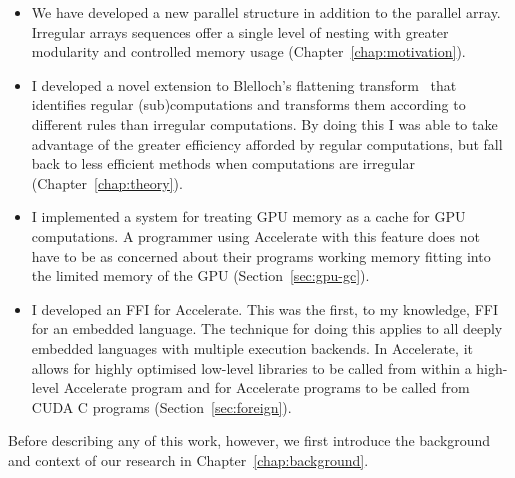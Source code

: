 \begin{itemize}
\item We have developed a new parallel structure in addition to the parallel array. Irregular arrays sequences offer a single level of nesting with greater modularity and controlled memory usage (Chapter~\ref{chap:motivation}).
\item I developed a novel extension to Blelloch's flattening transform~\cite{Blelloch:compiling1988,Blelloch:nesl1995} that identifies regular (sub)computations and transforms them according to different rules than irregular computations. By doing this I was able to take advantage of the greater efficiency afforded by regular computations, but fall back to less efficient methods when computations are irregular (Chapter~\ref{chap:theory}).
\item I implemented a system for treating GPU memory as a cache for GPU computations. A programmer using Accelerate with this feature does not have to be as concerned about their programs working memory fitting into the limited memory of the GPU (Section~\ref{sec:gpu-gc}).
\item I developed an FFI for Accelerate. This was the first, to my knowledge, FFI for an embedded language. The technique for doing this applies to all deeply embedded languages with multiple execution backends. In Accelerate, it allows for highly optimised low-level libraries to be called from within a high-level Accelerate program and for Accelerate programs to be called from CUDA C programs (Section~\ref{sec:foreign}).
\end{itemize}

Before describing any of this work, however, we first introduce the background and context of our research in Chapter~\ref{chap:background}.
